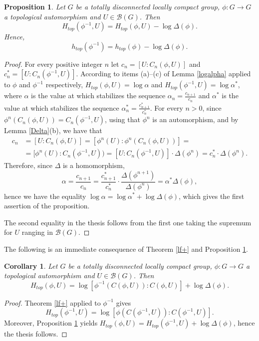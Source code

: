 \documentclass[11pt]{article}
\newtheorem{proposition}[theorem]{Proposition}
\newtheorem{corollary}[theorem]{Corollary}
\theoremstyle{definition}
\numberwithin{equation}{section}
\begin{document}
\begin{proposition}\label{^-1}
Let $G$ be a totally disconnected locally compact group, $\phi:G\to G$ a topological automorphism and $U\in\mathcal B(G)$. Then
$$H_{top}(\phi^{-1},U)= H_{top}(\phi,U)-\log\Delta(\phi).$$
Hence, $$h_{top}(\phi^{-1})=h_{top}(\phi)-\log\Delta(\phi).$$
\end{proposition}
\begin{proof}
For every positive integer $n$ let $c_n=[U:C_n(\phi,U)]$ and $c_n^*=[U:C_n(\phi^{-1},U)]$.
According to items (a)--(c) of Lemma \ref{logalpha} applied to $\phi$ and $\phi^{-1}$ respectively, $H_{top}(\phi,U)=\log\alpha$ and $H_{top}(\phi^{-1},U)=\log \alpha^*$, where $\alpha$ is the value at which stabilizes the sequence $\alpha_n=\frac{c_{n+1}}{c_{n}}$ and $\alpha^*$ is the value at which stabilizes the sequence $\alpha^*_n=\frac{c_{n+1}^*}{c_{n}^*}$. For every $n>0$, since $\phi^n(C_n(\phi,U))=C_n(\phi^{-1},U)$, using that $\phi^n$ is an automorphism, and by Lemma \ref{Delta}(b), we have that
\begin{equation*}\begin{split}
c_n &=[U:C_n(\phi,U)]=[\phi^n(U):\phi^n(C_n(\phi,U))]=\\&=[\phi^n(U):C_n(\phi^{-1},U))=[U:C_n(\phi^{-1},U)]\cdot\Delta(\phi^n)=c_n^*\cdot \Delta(\phi^n).
\end{split}\end{equation*}
Therefore, since $\Delta$ is a homomorphism, $$\alpha=\frac{c_{n+1}}{c_n}=\frac{c_{n+1}^*}{c_n^*}\cdot\frac{\Delta(\phi^{n+1})}{\Delta(\phi^n)}=\alpha^*\Delta(\phi),$$ hence we have the equality $\log\alpha=\log\alpha^*+\log\Delta(\phi)$, which gives the first assertion of the proposition.

The second equality in the thesis follows from the first one taking the supremum for $U$ ranging in $\mathcal B(G)$.
\end{proof}

The following is an immediate consequence of Theorem \ref{lf+} and Proposition \ref{^-1}.

\begin{corollary}\label{lf-}
Let $G$ be a totally disconnected locally compact group, $\phi:G\to G$ a topological automorphism and $U\in\mathcal B(G)$. Then 
$$H_{top}(\phi,U)=\log[\phi^{-1}(C(\phi,U)):C(\phi,U)]+\log\Delta(\phi).$$
\end{corollary}
\begin{proof}
Theorem \ref{lf+} applied to $\phi^{-1}$ gives $$H_{top}(\phi^{-1},U)=\log[\phi(C(\phi^{-1},U)):C(\phi^{-1},U)].$$ Moreover, Proposition \ref{^-1} yields $H_{top}(\phi,U)= H_{top}(\phi^{-1},U)+\log\Delta(\phi)$, hence the thesis follows.
\end{proof}
\end{document}
